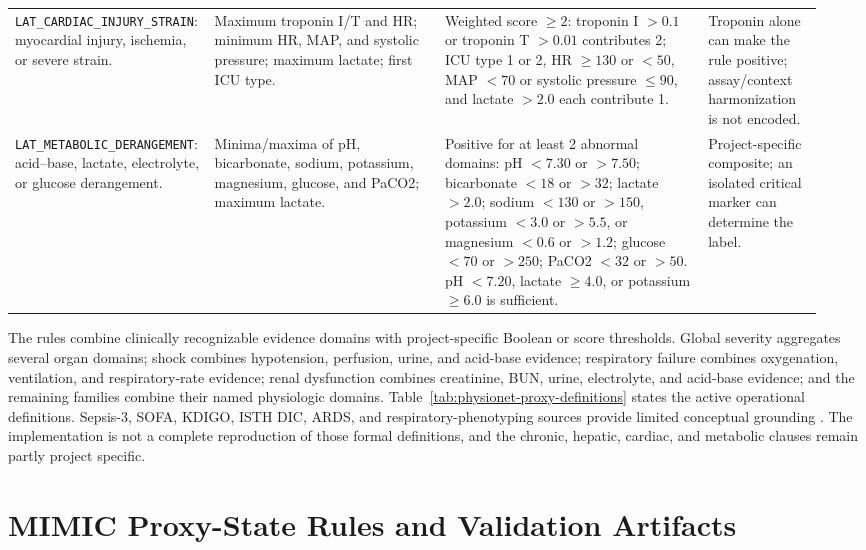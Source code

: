 \begin{landscape}
\begin{longtable}{@{}L{0.19\linewidth}L{0.29\linewidth}L{0.32\linewidth}L{0.14\linewidth}@{}}
\nolinkurl{LAT_CARDIAC_INJURY_STRAIN}: myocardial injury, ischemia, or severe strain. & Maximum troponin I/T and HR; minimum HR, MAP, and systolic pressure; maximum lactate; first ICU type. & Weighted score $\ge 2$: troponin I $>0.1$ or troponin T $>0.01$ contributes 2; ICU type 1 or 2, HR $\ge 130$ or $<50$, MAP $<70$ or systolic pressure $\le 90$, and lactate $>2.0$ each contribute 1. & Troponin alone can make the rule positive; assay/context harmonization is not encoded. \\
\nolinkurl{LAT_METABOLIC_DERANGEMENT}: acid--base, lactate, electrolyte, or glucose derangement. & Minima/maxima of pH, bicarbonate, sodium, potassium, magnesium, glucose, and PaCO2; maximum lactate. & Positive for at least 2 abnormal domains: pH $<7.30$ or $>7.50$; bicarbonate $<18$ or $>32$; lactate $>2.0$; sodium $<130$ or $>150$, potassium $<3.0$ or $>5.5$, or magnesium $<0.6$ or $>1.2$; glucose $<70$ or $>250$; PaCO2 $<32$ or $>50$.  pH $<7.20$, lactate $\ge 4.0$, or potassium $\ge 6.0$ is sufficient. & Project-specific composite; an isolated critical marker can determine the label. \\
\end{longtable}
\endgroup
\end{landscape}

The rules combine clinically recognizable evidence domains with project-specific Boolean or score thresholds.  Global severity aggregates several organ domains; shock combines hypotension, perfusion, urine, and acid-base evidence; respiratory failure combines oxygenation, ventilation, and respiratory-rate evidence; renal dysfunction combines creatinine, BUN, urine, electrolyte, and acid-base evidence; and the remaining families combine their named physiologic domains.  Table~\ref{tab:physionet-proxy-definitions} states the active operational definitions.  Sepsis-3, SOFA, KDIGO, ISTH DIC, ARDS, and respiratory-phenotyping sources provide limited conceptual grounding \cite{singer_2016_sepsis3,vincent_et_al_1996_sofa,kdigo_2012_acute_kidney_injury,taylor_et_al_2001_isth_dic,ranieri_et_al_2012_berlin_ards,essay_mosier_subbian_2020_acute_respiratory_failure_phenotyping}.  The implementation is not a complete reproduction of those formal definitions, and the chronic, hepatic, cardiac, and metabolic clauses remain partly project specific.

\section{MIMIC Proxy-State Rules and Validation Artifacts}
\label{sec:clinical-proxy-state-construction:mimic-proxy-state-rules-validation-artifacts}

